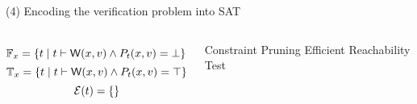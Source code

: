 \begin{frame}{}
	\begin{center}
		(4) Encoding the verification problem into SAT
	\end{center}
	\begin{columns}
		  \[
				\mathbb{F}_{x} = \{t \mid t \vdash {\sf W}(x, v)
				  \land P_{t}(x, v) = \bot\}
			\]
		  \[
				\mathbb{T}_{x} = \{t \mid t \vdash {\sf W}(x, v)
				  \land P_{t}(x, v) = \top\}
			\]
			\[
				\mathcal{E}(t) = \{\}
			\]
		  \pause
		  \begin{center}
				Constraint Pruning
				Efficient Reachability Test
			\end{center}
	\end{columns}
\end{frame}
